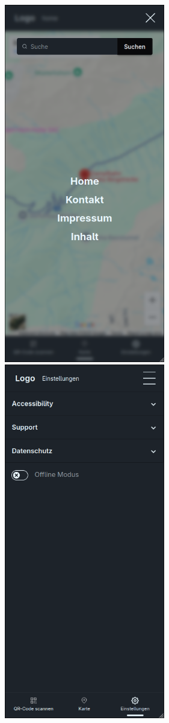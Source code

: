 \documentclass[10pt]{article}
\begin{document}
	\includegraphics[width=7cm ]{searchpage}
	\includegraphics[width=7cm]{settingspage}
	
\end{document}

